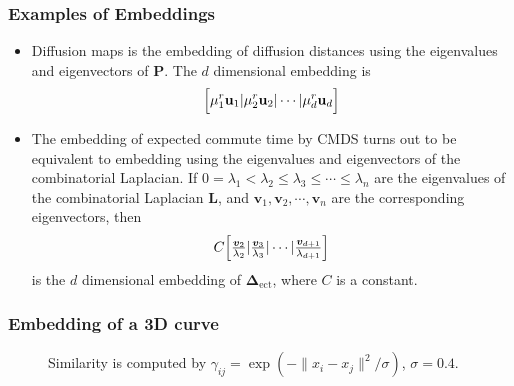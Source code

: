 \documentclass[professionalfonts,hyperref={pdfpagelabels=false,colorlinks=true,linkcolor=red}]{beamer}
\begin{document}
\begin{frame}
  \frametitle{Examples of Embeddings}
  \begin{itemize}
    \item Diffusion maps \cite{coifman06:_diffus_maps} is the
      embedding of diffusion distances using the eigenvalues and
      eigenvectors of $\mathbf{P}$. The $d$ dimensional embedding is
      \begin{equation*}
        \Bigl[ \mu_1^{r} \mathbf{u}_1 | \mu_{2}^{r} \mathbf{u}_2 |
        \cdots | \mu_{d}^{r}  \mathbf{u}_d \Bigr]
      \end{equation*}
    \item The embedding of expected commute time by CMDS turns out
      to be equivalent to embedding using the eigenvalues and
      eigenvectors of the combinatorial
      Laplacian. If $0 = \lambda_1 < \lambda_2 \leq \lambda_3 \leq \cdots
      \leq \lambda_{n}$ are the eigenvalues of the combinatorial
      Laplacian $\mathbf{L}$, and $\bm{v}_1, \bm{v}_2, \cdots,
      \bm{v}_n$ are the corresponding eigenvectors, then
      \begin{equation*}
        C \Bigl[ \tfrac{\bm{v}_{2}}{\lambda_2} |
        \tfrac{\bm{v}_3}{\lambda_3}
        | \cdots | \tfrac{\bm{v}_{d+1}}{\lambda_{d+1}} \Bigr]
      \end{equation*}
      is the $d$ dimensional embedding of
      $\bm{\Delta}_{\mathrm{ect}}$, where $C$ is a constant.  
  \end{itemize}
\end{frame}

\begin{frame}
\frametitle{Embedding of a 3D curve}
  \subfiglabelskip=0pt
  \begin{figure}[htbp]
    \label{fig:logistic}
    \centering
    \hspace{3pt}
    \caption{Similarity is computed by $\gamma_{ij} = \exp(-\|x_i -
      x_j\|^{2}/\sigma)$, $\sigma = 0.4$.}
  \end{figure}

\end{frame}

\end{document}

